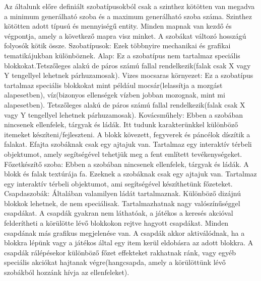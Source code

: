 Az általunk előre definiált szobatípusokból csak a szinthez kötötten van megadva a minimum generálható szoba és a maximum generálható szoba száma.
Szinthez kötötten adott típusú és mennyiségű entity.
Minden mapnak van kezdő és végpontja, amely a következő mapra visz minket.
A szobákat változó hosszágú folyosók kötik össze.
\newline
Szobatípusok:
\newline
Ezek többnyire mechanikai és grafikai tematikájukban különböznek.
\newline
Alap:
\newline
Ez a szobatípus nem tartalmaz speciális blokkokat.Tetszőleges alakú de páros számú fallal rendelkezik(falak csak X vagy Y tengellyel lehetnek párhuzamosak).
\newline
Vizes mocsaras környezet:
\newline
Ez a szobatípus tartalmaz speciális blokkokat mint például mocsár(lelassítja a mozgást alapesetben), víz(bizonyos ellenségek vízben jobban mozognak, mint mi alapesetben).
Tetszőleges alakú de páros számú fallal rendelkezik(falak csak X vagy Y tengellyel lehetnek párhuzamosak).
\newline
Kovácsműhely:
\newline
Ebben a szobában nincsenek ellenfelek, tárgyak és ládák. Itt tudunk karakterünkkel különböző itemeket készíteni/fejleszteni. A blokk kövezett, fegyverek és páncélok díszítik a falakat. Efajta szobáknak csak egy ajtajuk van. Tartalmaz egy interaktív térbeli objektumot, amely segítségével tehetjük meg a fent említett tevékenységeket.
\newline
Főzetkészítő szoba:
\newline
Ebben a szobában nincsenek ellenfelek, tárgyak és ládák. A blokk és falak textúrája fa. Ezeknek a szobáknak csak egy ajtajuk van. Tartalmaz egy interaktív térbeli objektumot, ami segítségével készíthetünk főzeteket.
\newline
Csapdaszobák:
\newline
Általában valamilyen ládát tartalmaznak.
Különböző dizájnú blokkok lehetnek, de nem speciálisak. Tartalmazhatnak nagy valószínűséggel csapdákat.
A csapdák gyakran nem láthatóak, a játékos a keresés akcióval felderítheti a körülötte lévő blokkokon rejtve hagyott csapdákat.
Minden csapdának más grafikus megjelenése van.
A csapdák akkor aktiválódnak, ha a blokkra lépünk vagy a játékos által egy item kerül eldobásra az adott blokkra.
A csapdák rálépésekor különböző főzet effekteket rakhatnak ránk, vagy egyéb speciális akciókat hajtanak végre(hangcsapda, amely a körülöttünk lévő szobákból hozzánk hívja az ellenfeleket).
